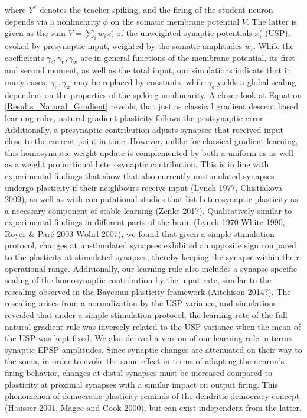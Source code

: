\documentclass[12pt]{article}
\newcommand{\mrm}{\mathrm}
\begin{document}
where $Y^*$ denotes the teacher spiking, and the firing of the student neuron depends via a nonlinearity $\phi$ on the somatic membrane potential $V$. The latter is given as the sum $V=\sum_i w_i x_i^{\epsilon}$ of the unweighted synaptic potentials $x_i^{\epsilon}$ (USP), evoked by presynaptic input, weighted by the somatic amplitudes $w_i$. While the coefficients $\gamma_{\mrm s},\gamma_{\mrm u},\gamma_{\mrm w}$ are in general functions of the membrane potential, its first and second moment, as well as the total input, our simulations indicate that in many cases, $\gamma_{\mrm u},\gamma_{\mrm w}$ may be replaced by constants, while $\gamma_{\mrm s}$ yields a global scaling dependent on the properties of the spiking-nonlinearity.
A closer look at Equation \ref{Results_Natural_Gradient} reveals, that just as classical gradient descent based learning rules, natural gradient plasticity follows the postsynaptic error. Additionally, a presynaptic contribution adjusts synapses that received input close to the current point in time. However, unlike for classical gradient learning, this homosynaptic weight update is complemented by both a uniform as as well as a weight proportional heterosynaptic contribution. This is in line with experimental findings that show that also currently unstimulated synapses undergo plasticity if their neighbours receive input (Lynch 1977, Chistiakova 2009), as well as with computational studies that list heterosynaptic plasticity as a necessary component of stable learning (Zenke 2017). Qualitatively similar to experimental findings in different parts of the brain (Lynch 1970 White 1990, Royer \& Paré 2003 Wöhrl 2007), we found that given a simple stimulation protocol, changes at unstimulated synapses exhibited an opposite sign compared to the plasticity at stimulated synapses, thereby keeping the synapse within their operational range.
Additionally, our learning rule also includes a synapse-specific scaling of the homosynaptic contribution by the input rate, similar to the rescaling observed in the Bayesian plasticity framework (Aitchison 2014?). The rescaling arises from a normalization by the USP variance, and simulations revealed that under a simple stimulation protocol, the learning rate of the full natural gradient rule was inversely related to the USP variance when the mean of the USP was kept fixed. 
We also derived a version of our learning rule in terms synaptic EPSP amplitudes. Since synaptic changes are attenuated on their way to the soma, in order to evoke the same effect in terms of adapting the neuron's firing behavior, changes at distal synapses must be increased compared to plasticity at proximal synapses with a similar impact on output firing. This phenomenon of democratic plasticity reminds of the dendritic democracy concept (Häusser 2001, Magee and Cook 2000), but can exist independent from the latter.
\end{document}
